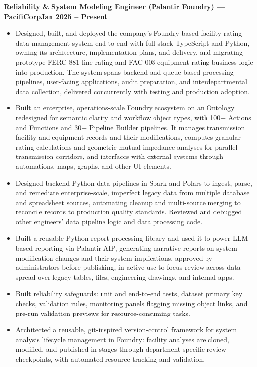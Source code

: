 \documentclass[10pt, letterpaper]{article}
\newcommand{\jobline}[2]{%
  \vspace{5pt}%
  \noindent\textbf{#1}\hfill\textbf{#2}\par%
  \vspace{1pt}%
}
\newenvironment{rlist}{%
  \begin{itemize}[leftmargin=1.4em, itemsep=1pt, topsep=2pt, parsep=0pt]%
}{%
  \end{itemize}%
}
\begin{document}
\jobline{Reliability \& System Modeling Engineer (Palantir Foundry) --- PacifiCorp}{Jan 2025 -- Present}
\begin{rlist}
  \item Designed, built, and deployed the company's Foundry-based facility rating data management system end to end with full-stack TypeScript and Python, owning its architecture, implementation plans, and delivery, and migrating prototype FERC-881 line-rating and FAC-008 equipment-rating business logic into production. The system spans backend and queue-based processing pipelines, user-facing applications, audit preparation, and interdepartmental data collection, delivered concurrently with testing and production adoption.
  \item Built an enterprise, operations-scale Foundry ecosystem on an Ontology redesigned for semantic clarity and workflow object types, with 100+ Actions and Functions and 30+ Pipeline Builder pipelines. It manages transmission facility and equipment records and their modifications, computes granular rating calculations and geometric mutual-impedance analyses for parallel transmission corridors, and interfaces with external systems through automations, maps, graphs, and other UI elements.
  \item Designed backend Python data pipelines in Spark and Polars to ingest, parse, and remediate enterprise-scale, imperfect legacy data from multiple database and spreadsheet sources, automating cleanup and multi-source merging to reconcile records to production quality standards. Reviewed and debugged other engineers' data pipeline logic and data processing code.
  \item Built a reusable Python report-processing library and used it to power LLM-based reporting via Palantir AIP, generating narrative reports on system modification changes and their system implications, approved by administrators before publishing, in active use to focus review across data spread over legacy tables, files, engineering drawings, and internal apps.
  \item Built reliability safeguards: unit and end-to-end tests, dataset primary key checks, validation rules, monitoring panels flagging missing object links, and pre-run validation previews for resource-consuming tasks.
  \item Architected a reusable, git-inspired version-control framework for system analysis lifecycle management in Foundry: facility analyses are cloned, modified, and published in stages through department-specific review checkpoints, with automated resource tracking and validation.

\end{rlist}
\end{document}

